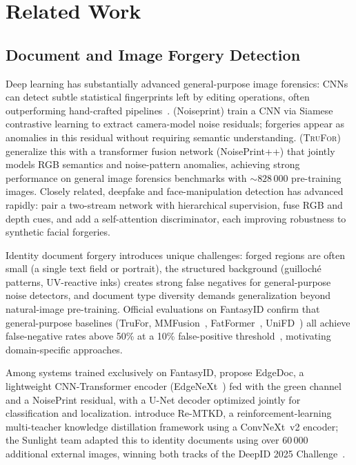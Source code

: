 \documentclass[final,5p,times,twocolumn,number]{elsarticle}
\newcommand{\revB}[1]{#1}
\begin{document}

\section{Related Work}
\label{sec:related}

\subsection{Document and Image Forgery Detection}

Deep learning has substantially advanced general-purpose image forensics:
CNNs can detect subtle statistical fingerprints left by editing operations,
often outperforming hand-crafted pipelines~\citep{mantranet2019}.
\citet{cozzolino2020noiseprint} (Noiseprint) train a CNN via Siamese
contrastive learning to extract camera-model noise residuals; forgeries appear
as anomalies in this residual without requiring semantic understanding.
\citet{trufor2023} (\textsc{TruFor}) generalize this with a transformer fusion
network (NoisePrint++) that jointly models RGB semantics and noise-pattern
anomalies, achieving strong performance on general image forensics benchmarks
with ${\sim}828\,000$ pre-training images. \revB{Closely related, deepfake and
face-manipulation detection has advanced rapidly:
\citet{liang2023twostream} pair a two-stream network with hierarchical
supervision, \citet{leporoni2024guided} fuse {RGB} and depth cues, and
\citet{wang2024deepfake} add a self-attention discriminator, each improving
robustness to synthetic facial forgeries.}

Identity document forgery introduces unique challenges: forged regions are
often small (a single text field or portrait), the structured background
(guilloché patterns, UV-reactive inks) creates strong false negatives for
general-purpose noise detectors, and document type diversity demands
generalization beyond natural-image pre-training. Official evaluations on
FantasyID confirm that general-purpose baselines (TruFor, MMFusion~\citep{mmfusion2024},
FatFormer~\citep{fatformer2024}, UniFD~\citep{unifd2023}) all achieve
false-negative rates above 50\% at a 10\% false-positive
threshold~\citep{fantasyid2024}, motivating domain-specific approaches.

Among systems trained exclusively on FantasyID, \citet{edgedoc2025} propose
EdgeDoc, a lightweight CNN-Transformer encoder (EdgeNeXt~\citep{edgenext2022}) fed with the green
channel and a NoisePrint residual, with a U-Net decoder optimized jointly for
classification and localization. \citet{remtkd2025} introduce Re-MTKD, a
reinforcement-learning multi-teacher knowledge distillation framework using a
ConvNeXt~v2 encoder; the Sunlight team adapted this to identity documents using
over 60\,000 additional external images, winning both tracks of the DeepID
2025 Challenge~\citep{deepid2025challenge}.
\end{document}
